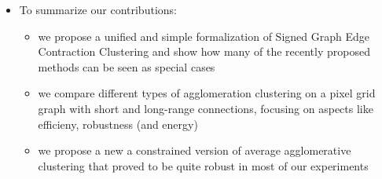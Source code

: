 \documentclass[10pt,twocolumn,letterpaper]{article}
\begin{document}
\begin{itemize}
\item To summarize our contributions:
\begin{itemize}
\item we propose a unified and simple formalization of Signed Graph Edge Contraction Clustering and show how many of the recently proposed methods can be seen as special cases
\item we compare different types of agglomeration clustering on a pixel grid graph with short and long-range connections, focusing on aspects like efficieny, robustness (and energy) 
\item we propose a new a constrained version of average agglomerative clustering that proved to be quite robust in most of our experiments
\end{itemize}
\end{itemize}
\end{document}
